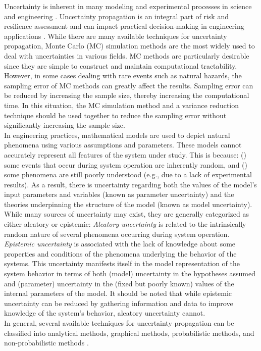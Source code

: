     Uncertainty is inherent in many modeling and experimental processes in science and engineering \cite{dror_modeling_2002}. Uncertainty propagation is an integral part of risk and resilience assessment and can impact practical decision-making in engineering applications \cite{adhikari_experimental_2009,alpak_techniques_2013}. While there are many available techniques for uncertainty propagation, Monte Carlo (MC) simulation methods are the most widely used to deal with uncertainties in various fields. MC methods are particularly desirable since they are simple to construct and maintain computational tractability. However, in some cases dealing with rare events such as natural hazards, the sampling error of MC methods can greatly affect the results. Sampling error can be reduced by increasing the sample size, thereby increasing the computational time. In this situation, the MC simulation method and a variance reduction technique should be used together to reduce the sampling error without significantly increasing the sample size.\\
    In engineering practices, mathematical models are used to depict natural phenomena using various assumptions and parameters. These models cannot accurately represent all features of the system under study. This is because: () some events that occur during system operation are inherently random, and () some phenomena are still poorly understood (e.g., due to a lack of experimental results). As a result, there is uncertainty regarding both the values of the model's input parameters and variables (known as parameter uncertainty) and the theories underpinning the structure of the model (known as model uncertainty). \\
    While many sources of uncertainty may exist, they are generally categorized as either aleatory or epistemic: \textit{Aleatory uncertainty} is related to the intrinsically random nature of several phenomena occurring during system operation. \textit{Epistemic uncertainty} is associated with the lack of knowledge about some properties and conditions of the phenomena underlying the behavior of the systems. This uncertainty manifests itself in the model representation of the system behavior in terms of both (model) uncertainty in the hypotheses assumed and (parameter) uncertainty in the (fixed but poorly known) values of the internal parameters of the model. It should be noted that while epistemic uncertainty can be reduced by gathering information and data to improve knowledge of the system's behavior, aleatory uncertainty cannot. \\
    In general, several available techniques for uncertainty propagation can be classified into analytical methods, graphical methods, probabilistic methods, and non-probabilistic methods \cite{hayes_uncertainty_2011}.   
    
